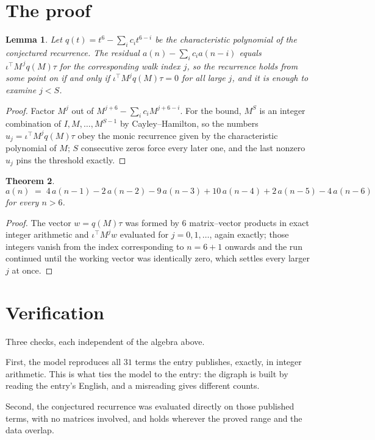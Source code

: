 \documentclass[11pt,a4paper]{article}
\theoremstyle{plain}
\newtheorem{theorem}{Theorem}
\newtheorem{lemma}[theorem]{Lemma}
\theoremstyle{definition}
\begin{document}
\section{The proof}

\begin{lemma}\label{lem:crit}
Let $q(t)=t^{6}-\sum_i c_it^{6-i}$ be the characteristic polynomial of the
conjectured recurrence. The residual $a(n)-\sum_ic_ia(n-i)$ equals
$\iota^{\!\top}M^{\,j}q(M)\tau$ for the corresponding walk index $j$, so the recurrence
holds from some point on if and only if $\iota^{\!\top}M^{j}q(M)\tau=0$ for all large $j$,
and it is enough to examine $j<S$.
\end{lemma}

\begin{proof}
Factor $M^{j}$ out of $M^{j+6}-\sum_ic_iM^{j+6-i}$. For the bound, $M^{S}$
is an integer combination of $I,M,\dots,M^{S-1}$ by Cayley--Hamilton, so the numbers
$u_j=\iota^{\!\top}M^{j}q(M)\tau$ obey the monic recurrence given by the characteristic
polynomial of $M$; $S$ consecutive zeros force every later one, and the last nonzero $u_j$
pins the threshold exactly.
\end{proof}

\begin{theorem}
\[
a(n)\;=\;4\,a(n-1) - 2\,a(n-2) - 9\,a(n-3) + 10\,a(n-4) + 2\,a(n-5) - 4\,a(n-6)
\]
for every $n>6$.
\end{theorem}

\begin{proof}
The vector $w=q(M)\tau$ was formed by $6$ matrix--vector products in exact integer
arithmetic and $\iota^{\!\top}M^{j}w$ evaluated for $j=0,1,\dots$, again exactly; those
integers vanish from the index corresponding to $n=6+1$ onwards and the run continued
until the working vector was identically zero, which settles every larger $j$ at once.
\end{proof}

\section{Verification}

Three checks, each independent of the algebra above.

First, the model reproduces all $31$ terms the entry publishes, exactly, in integer
arithmetic. This is what ties the model to the entry: the digraph is built by reading the
entry's English, and a misreading gives different counts.

Second, the conjectured recurrence was evaluated directly on those published terms, with no
matrices involved, and holds wherever the proved range and the data overlap.
\end{document}
